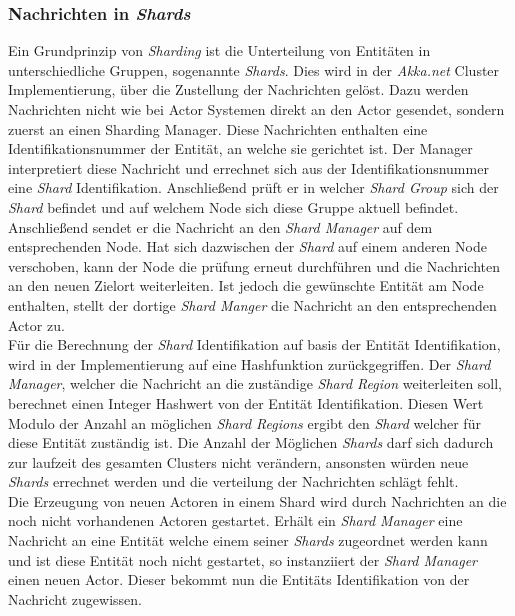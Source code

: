 \subsubsection{Nachrichten in \textit{Shards}}
Ein Grundprinzip von \textit{Sharding} ist die Unterteilung von Entitäten in unterschiedliche Gruppen, sogenannte \textit{Shards}. Dies wird in der \textit{Akka.net} Cluster Implementierung, über die Zustellung der Nachrichten gelöst. Dazu werden Nachrichten nicht wie bei Actor Systemen direkt an den Actor gesendet, sondern zuerst an einen Sharding Manager. Diese Nachrichten enthalten eine Identifikationsnummer der Entität, an welche sie gerichtet ist. Der Manager interpretiert diese Nachricht und errechnet sich aus der Identifikationsnummer eine \textit{Shard} Identifikation. Anschließend prüft er in welcher \textit{Shard Group} sich der \textit{Shard} befindet und auf welchem Node sich diese Gruppe aktuell befindet. Anschließend sendet er die Nachricht an den \textit{Shard Manager} auf dem entsprechenden Node. Hat sich dazwischen der \textit{Shard} auf einem anderen Node verschoben, kann der Node die prüfung erneut durchführen und die Nachrichten an den neuen Zielort weiterleiten. Ist jedoch die gewünschte Entität am Node enthalten, stellt der dortige \textit{Shard Manger} die Nachricht an den entsprechenden Actor zu. \\
Für die Berechnung der \textit{Shard} Identifikation auf basis der Entität Identifikation, wird in der Implementierung auf eine Hashfunktion zurückgegriffen. Der \textit{Shard Manager}, welcher die Nachricht an die zuständige \textit{Shard Region} weiterleiten soll, berechnet einen Integer Hashwert von der Entität Identifikation. Diesen Wert Modulo der Anzahl an möglichen \textit{Shard Regions} ergibt den \textit{Shard} welcher für diese Entität zuständig ist. Die Anzahl der Möglichen \textit{Shards} darf sich dadurch zur laufzeit des gesamten Clusters nicht verändern, ansonsten würden neue \textit{Shards} errechnet werden und die verteilung der Nachrichten schlägt fehlt. \\
Die Erzeugung von neuen Actoren in einem Shard wird durch Nachrichten an die noch nicht vorhandenen Actoren gestartet. Erhält ein \textit{Shard Manager} eine Nachricht an eine Entität welche einem seiner \textit{Shards} zugeordnet werden kann und ist diese Entität noch nicht gestartet, so instanziiert der \textit{Shard Manager} einen neuen Actor. Dieser bekommt nun die Entitäts Identifikation von der Nachricht zugewissen.